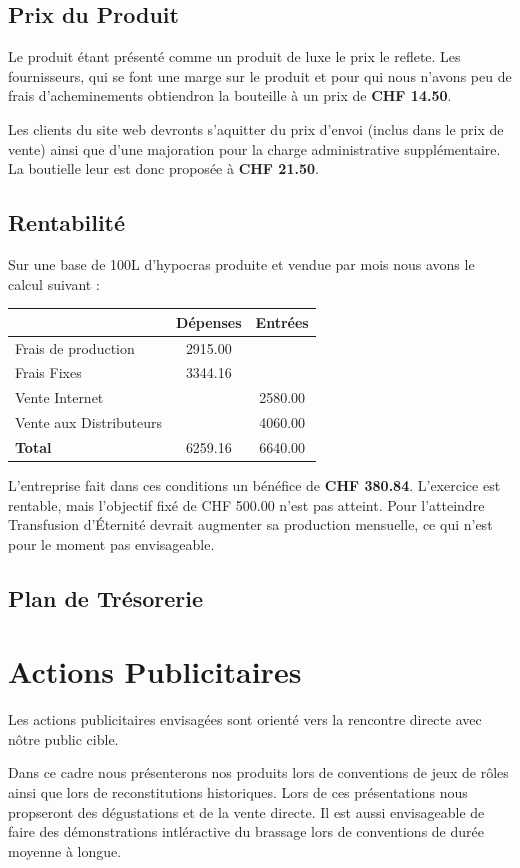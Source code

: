 \documentclass[10pt,a4paper]{article}
\newcommand{\tde}{Transfusion d'Éternité}
\begin{document}
\subsection{Prix du Produit}
Le produit étant présenté comme un produit de luxe le prix le reflete.
Les fournisseurs, qui se font une marge sur le produit et pour qui nous n'avons peu de frais d'acheminements obtiendron la bouteille à un prix de \textbf{CHF 14.50}.

Les clients du site web devronts s'aquitter du prix d'envoi (inclus dans le prix de vente) ainsi que d'une majoration pour la charge administrative supplémentaire.
La boutielle leur est donc proposée à \textbf{CHF 21.50}.
\subsection{Rentabilité}
Sur une base de 100L d'hypocras produite et vendue par mois nous avons le calcul suivant :

\vspace{0.5cm}
\begin{tabular}{|l|S[table-format=3.2]|S[table-format=3.2]|}
\hline
& \textbf{Dépenses} & \textbf{Entrées} \\\hline
Frais de production & 2915.00 & \\
Frais Fixes & 3344.16 & \\
Vente Internet & & 2580.00 \\
Vente aux Distributeurs & & 4060.00 \\\hline
\textbf{Total} & 6259.16 & 6640.00 \\\hline
\end{tabular}

\vspace{0.5cm}
L'entreprise fait dans ces conditions un bénéfice de \textbf{CHF 380.84}.
L'exercice est rentable, mais l'objectif fixé de CHF 500.00 n'est pas atteint.
Pour l'atteindre \tde{} devrait augmenter sa production mensuelle, ce qui n'est pour le moment pas envisageable.
\subsection{Plan de Trésorerie}
\section{Actions Publicitaires}
Les actions publicitaires envisagées sont orienté vers la rencontre directe avec nôtre public cible.

Dans ce cadre nous présenterons nos produits lors de conventions de jeux de rôles ainsi que lors de reconstitutions historiques.
Lors de ces présentations nous propseront des dégustations et de la vente directe.
Il est aussi envisageable de faire des démonstrations intléractive du brassage lors de conventions de durée moyenne à longue.
\end{document}
